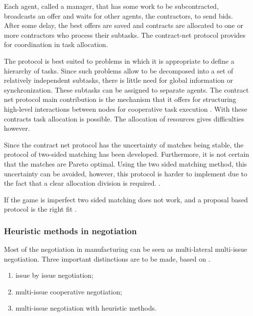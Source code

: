 Each agent, called a manager, that has some work to be subcontracted, broadcasts an offer and waits for other agents, the contractors, to send bids. After some delay, the best offers are saved and contracts are allocated to one or more contractors who process their subtasks. The contract-net protocol provides for coordination in task allocation. 

The protocol is best suited to problems in which it is appropriate to define a hierarchy of tasks. Since such problems allow to be decomposed into a set of relatively independent subtasks, there is little need for global information or synchronization. These subtasks can be assigned to separate agents. The contract net protocol main contribution is the mechanism that it offers for structuring high-level interactions between nodes for cooperative task execution \citep{smith1980communication}. With these contracts task allocation is possible. The allocation of resources gives difficulties however. 

Since the contract net protocol has the uncertainty of matches being stable, the protocol of two-sided matching has been developed. Furthermore, it is not certain that the matches are Pareto optimal. Using the two sided matching method, this uncertainty can be avoided, however, this protocol is harder to implement due to the fact that a clear allocation division is required. \citep{fatima2014principles}.
 
If the game is imperfect two sided matching does not work, and a proposal based protocol is the right fit \citep{rahwan2003argumentation}.





\subsubsection{Heuristic methods in negotiation}
\label{sec:lit:learn}
Most of the negotiation in manufacturing can be seen as multi-lateral multi-issue negotiation. Three important distinctions are to be made, based on \citet{lai2004literature}. 
\begin{enumerate}
	\item
	issue by issue negotiation;
	\item
	multi-issue cooperative negotiation;
	\item
	multi-issue negotiation with heuristic methods.
	\end{enumerate}
	
